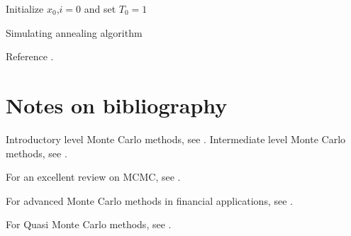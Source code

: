 \begin{refsection}
\begin{algorithm}[H]
	\SetAlgoLined
	Initialize $x_0$,$i=0$ and set $T_0 = 1$\\
	\caption{Simulating annealing algorithm}
\end{algorithm}

\begin{remark}
	Reference \cite{andrieu2003introduction}\cite{spall2005introduction}.
\end{remark}

\section{Notes on bibliography}

Introductory level Monte Carlo methods, see \cite{dunn2011exploring}.
Intermediate level Monte Carlo methods, see \cite{kroese2013handbook}\cite{robert2013monte}\cite{spall2005introduction}\cite{mcbook}.

For an excellent review on MCMC, see \cite{andrieu2003introduction}.

For advanced Monte Carlo methods in financial applications, see \cite{jackel2002monte}.

For Quasi Monte Carlo methods, see \cite{niederreiter1992random}\cite{jackel2002monte}.
\printbibliography

\end{refsection}
